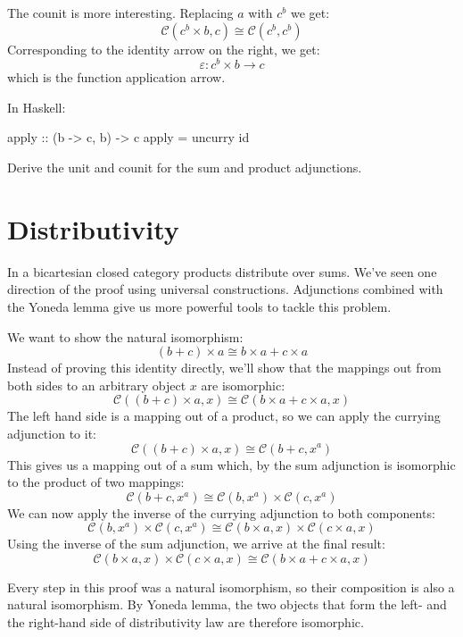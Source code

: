 \documentclass[DaoFP]{subfiles}
\begin{document}
The counit is more interesting. Replacing $a$ with $c^b$ we get:
\[  \mathcal{C}(c^b \times b, c ) \cong  \mathcal{C} (c^b, c^b)  \]
Corresponding to the identity arrow on the right, we get:
\[ \varepsilon \colon c^b \times b \to c \]
which is the function application arrow. 

In Haskell:
\begin{haskell}
apply :: (b -> c, b) -> c
apply = uncurry id
\end{haskell}

\begin{exercise}
Derive the unit and counit for the sum and product adjunctions.
\end{exercise}

\section{Distributivity}

In a bicartesian closed category products distribute over sums. We've seen one direction of the proof using universal constructions. Adjunctions combined with the Yoneda lemma give us more powerful tools to tackle this problem.

We want to show the natural isomorphism:
\[(b + c) \times a \cong b \times a + c \times a \]
Instead of proving this identity directly, we'll show that the mappings out from both sides to an arbitrary object $x$ are isomorphic:
\[  \mathcal{C} ((b + c) \times a, x) \cong \mathcal{C}(b \times a + c \times a, x) \]
The left hand side is a mapping out of a product, so we can apply the currying adjunction to it:
\[  \mathcal{C} ((b + c) \times a, x) \cong \mathcal{C}(b + c, x^a) \]
This gives us a mapping out of a sum which, by the sum adjunction is isomorphic to the product of two mappings:
\[  \mathcal{C}(b + c, x^a) \cong \mathcal{C}(b, x^a) \times \mathcal{C}(c, x^a)\]
We can now apply the inverse of the currying adjunction to both components:
\[  \mathcal{C}(b, x^a) \times \mathcal{C}(c, x^a) \cong \mathcal{C}(b \times a, x) \times \mathcal{C}(c \times a, x)\]
Using the inverse of the sum adjunction, we arrive at the final result:
\[ \mathcal{C}(b \times a, x) \times \mathcal{C}(c \times a, x) \cong \mathcal{C}(b \times a + c \times a, x) \]

Every step in this proof was a natural isomorphism, so their composition is also a natural isomorphism. By Yoneda lemma, the two objects that form the left- and the right-hand side of distributivity law are therefore isomorphic.
\end{document}
